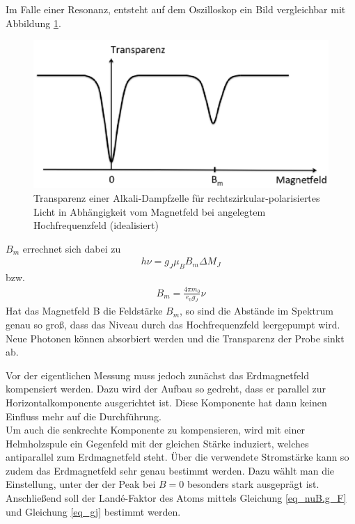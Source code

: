 Im Falle einer Resonanz, entsteht auf dem Oszilloskop ein Bild vergleichbar mit Abbildung \ref{pic_resonanz}. 
\begin{figure}
\includegraphics[scale=.3]{../pics/resonanz.pdf}
\caption{Transparenz einer Alkali-Dampfzelle für rechtszirkular-polarisiertes Licht in Abhängigkeit vom Magnetfeld bei angelegtem Hochfrequenzfeld (idealisiert)}
\label{pic_resonanz}
\end{figure}
$B_m$ errechnet sich dabei zu
\begin{align*}
h\nu = g_J \mu_B B_m \Delta M_J
\end{align*}
bzw.
\begin{align}
B_m=\frac{4\pi m_0}{e_0 g_J}\nu
\label{eq_nuB.g_F}
\end{align}
Hat das Magnetfeld B die Feldstärke $B_m$, so sind die Abstände im Spektrum genau so groß, dass das Niveau durch das Hochfrequenzfeld leergepumpt wird. Neue Photonen können absorbiert werden und die Transparenz der Probe sinkt ab. 

Vor der eigentlichen Messung muss jedoch zunächst das Erdmagnetfeld kompensiert werden. Dazu wird der Aufbau so gedreht, dass er parallel zur Horizontalkomponente ausgerichtet ist. Diese Komponente hat dann keinen Einfluss mehr auf die Durchführung.\\
Um auch die senkrechte Komponente zu kompensieren, wird mit einer Helmholzspule ein Gegenfeld mit der gleichen Stärke induziert, welches antiparallel zum Erdmagnetfeld steht. Über die verwendete Stromstärke kann so zudem das Erdmagnetfeld sehr genau bestimmt werden. Dazu wählt man die Einstellung, unter der der Peak bei $B=0$ besonders stark ausgeprägt ist.\\

Anschließend soll der Landé-Faktor des Atoms mittels Gleichung \eqref{eq_nuB.g_F} und Gleichung \eqref{eq_gj} bestimmt werden.\\

